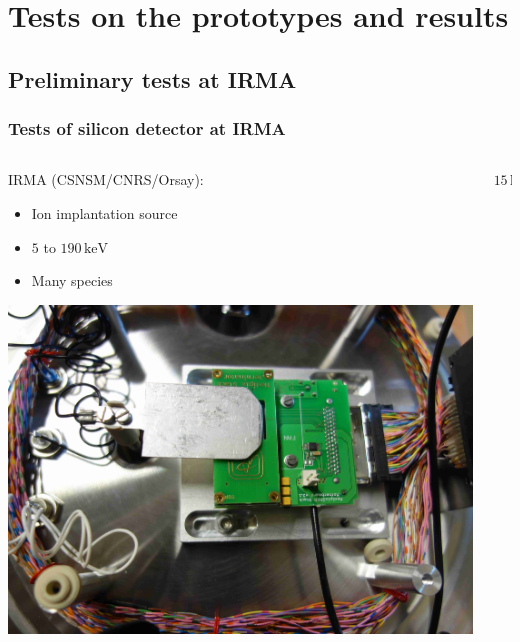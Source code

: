 \section{Tests on the prototypes and results}
\subsection{Preliminary tests at IRMA}
\begin{frame}
  \frametitle{Tests of silicon detector at IRMA}
  \begin{columns}
    \begin{column}{0.45\textwidth}
      IRMA (CSNSM/CNRS/Orsay):
      \begin{itemize}
        \item Ion implantation source
        \item $5$ to $190\,\mathrm{keV}$
        \item Many species
      \end{itemize}
      \includegraphics[width=\textwidth]{04_Test/fig/fig000_IRMA_setup01.jpg}
    \end{column}
    \begin{column}{0.45\textwidth}
      \begin{columns}
        \begin{column}{0.45\textwidth}
          \centering
          $15\,\mathrm{keV}$

\end{column}
\end{columns}
\end{column}
\end{columns}
\end{frame}
